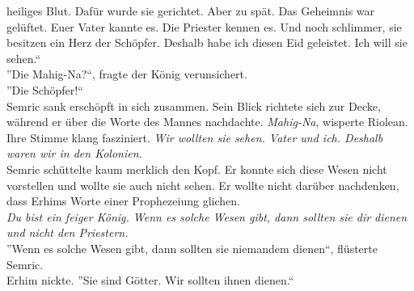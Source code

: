 heiliges Blut. Dafür wurde sie gerichtet. Aber zu spät. Das Geheimnis war gelüftet. Euer Vater 
kannte es. Die Priester kennen es. Und noch schlimmer, sie besitzen ein Herz der Schöpfer. Deshalb 
habe ich diesen Eid geleistet. Ich will sie sehen.``\\
''Die Mahig-Na?``, fragte der König verunsichert.\\
''Die Schöpfer!``\\
Semric sank erschöpft in sich zusammen. Sein Blick richtete sich zur Decke, während er über die 
Worte des Mannes nachdachte. \textit{Mahig-Na}, wisperte Riolean. Ihre Stimme klang fasziniert. 
\textit{Wir wollten sie sehen. Vater und ich. Deshalb waren wir in den Kolonien.}\\
Semric schüttelte kaum merklich den Kopf. Er konnte sich diese Wesen nicht vorstellen und wollte 
sie 
auch nicht sehen. Er wollte nicht darüber nachdenken, dass Erhims Worte einer Prophezeiung 
glichen.\\
\textit{Du bist ein feiger König. Wenn es solche Wesen gibt, dann sollten sie dir dienen und nicht 
den Priestern.}\\
''Wenn es solche Wesen gibt, dann sollten sie niemandem dienen``, flüsterte Semric.\\
Erhim nickte. ''Sie sind Götter. Wir sollten ihnen dienen.``\\

